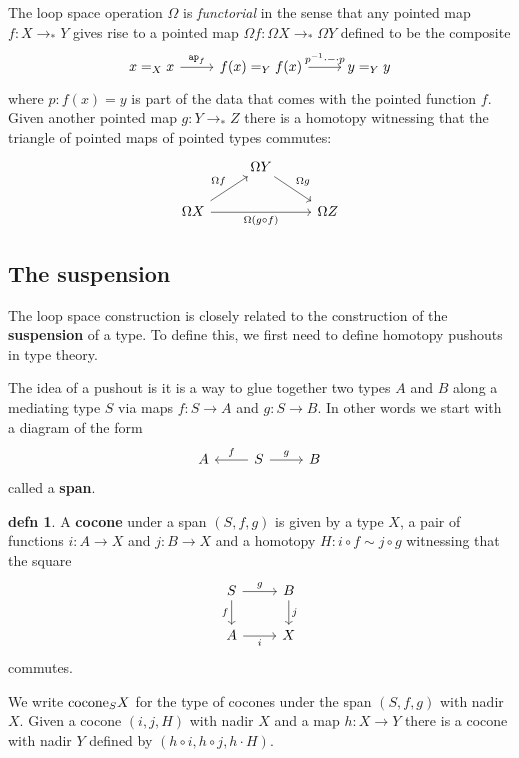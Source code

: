 \documentclass{amsart}
\theoremstyle{theorem}
\theoremstyle{definition}
\newtheorem*{defn}{defn}
\theoremstyle{remark}
\newcommand{\0}{\mathbbe{0}}
\newcommand{\1}{\mathbbe{1}}
\newcommand{\2}{\mathbbe{2}}
\newcommand{\3}{\mathbbe{3}}
\newcommand{\4}{\mathbbe{4}}
\newcommand{\term}[1]{{\textup{\texttt{#1}}}}
\newcommand{\type}[1]{{\textup{#1}}}
\newcommand{\ap}{\term{ap}}
\begin{document}
The loop space operation $\Omega$ is \emph{functorial} in the sense that any pointed map $f : X \to_* Y$ gives rise to a pointed map $\Omega f : \Omega X \to_* \Omega Y$ defined to be the composite
\[
\begin{tikzcd} x=_Xx \arrow[r, "\ap_f"] & f(x) =_Y f(x) \arrow[r, "p^{-1} \cdot - \cdot p"] & y =_Y y
\end{tikzcd}
\]
where $p : f(x) = y$ is part of the data that comes with the pointed function $f$. Given another pointed map $g : Y \to_* Z$ there is a homotopy witnessing that the triangle of pointed maps of pointed types commutes:
\[
\begin{tikzcd}&\Omega Y \arrow[dr, "\Omega g"] \\ \Omega X \arrow[ur, "\Omega f"] \arrow[rr, "\Omega(g \circ f)"'] & & \Omega Z
\end{tikzcd}
\]

\subsection*{The suspension}

The loop space construction is closely related to the construction of the \textbf{suspension} of a type. To define this, we first need to define homotopy pushouts in type theory.

The idea of a pushout is it is a way to glue together two types $A$ and $B$ along a mediating type $S$ via maps $f \colon S \to A$ and $g \colon S \to B$. In other words we start with a diagram of the form
\[ \begin{tikzcd} A & S \arrow[l, "f"'] \arrow[r, "g"] & B
\end{tikzcd}
\]
called a \textbf{span}.

\begin{defn} A \textbf{cocone} under a span $(S,f,g)$ is given by a type $X$, a pair of functions $i : A \to X$ and $j : B \to X$ and a homotopy $H : i \circ f \sim j \circ g$ witnessing that the square
\[
\begin{tikzcd} S \arrow[d, "f"'] \arrow[r, "g"] & B \arrow[d, "j"] \\ A \arrow[r, "i"'] & X
\end{tikzcd}
\]
commutes.
\end{defn}

We write $\type{cocone}_SX$ for the type of cocones under the span $(S,f,g)$ with nadir $X$. Given a cocone $(i,j,H)$ with nadir $X$ and a map $h : X \to Y$ there is a cocone with nadir $Y$ defined by $(h \circ i, h \circ j, h \cdot H)$. 
\end{document}
